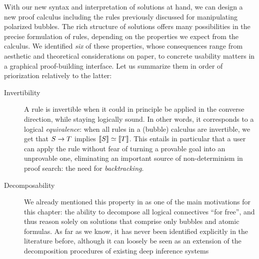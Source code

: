 With our new syntax and interpretation of solutions at hand, we can design a new
proof calculus including the rules previously discussed for manipulating
polarized bubbles. The rich structure of solutions offers many possibilities in
the precise formulation of rules, depending on the properties we expect from the
calculus. We identified \emph{six} of these properties, whose consequences range
from aesthetic and theoretical considerations on paper, to concrete usability
matters in a graphical proof-building interface. Let us summarize them in order
of priorization relatively to the latter:
\begin{description}
  \item[Invertibility]
    A rule is invertible when it could in principle be applied in the converse
    direction, while staying logically sound. In other words, it corresponds to
    a logical \emph{equivalence}: when all rules in a (bubble) calculus are
    invertible, we get that $S \rightarrow T$ implies $\left\llbracket S \right\rrbracket \simeq
    \left\llbracket T \right\rrbracket$. This entails in particular that a user can apply the rule
    without fear of turning a provable goal into an unprovable
    one, eliminating an important source of
    non-determinism in proof search: the need for
    \emph{backtracking}.
  \item[Decomposability]
    We already mentioned this property in  as one of the
    main motivations for this chapter: the ability to decompose all logical
    connectives ``for free'', and thus reason solely on solutions that comprise
    only bubbles and atomic formulas. As far as we know, it has never been
    identified explicitly in the literature before, although it can loosely be
    seen as an extension of the decomposition procedures of existing deep
    inference systems
\end{description}

